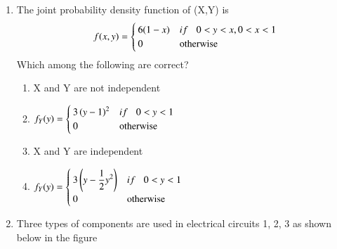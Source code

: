 \renewcommand{\theequation}{\theenumi}
\renewcommand{\thefigure}{\theenumi}
\begin{enumerate}[label=\thesection.\arabic*.,ref=\thesection.\theenumi]
\item The joint probability density function of (X,Y) is
\begin{equation}
    f(x,y) =
    \begin{cases}
        6(1-x) & if \hspace{0.3cm}0<y<x ,0<x<1\label{0.0.1} \\
        0      & \text{otherwise}
    \end{cases}
\end{equation}
Which among the following are correct?
\begin{enumerate}\itemsep0.3cm
    \item X and Y are not independent
    \item
          $ f_Y(y) =
              \begin{cases}
                  3\left(y-1\right)^{2} & if \hspace{0.3cm}0<y<1 \\
                  0               & \text{otherwise}
              \end{cases}$
    \item X and Y are independent
    \item $ f_Y(y) =
              \begin{cases}
                  3\left(\displaystyle{y-\frac{1}{2}{y}^2}\right) & if \hspace{0.3cm}0<y<1 \\
                  0                                         & \text{otherwise}
              \end{cases}$
\end{enumerate}
%
\solution

%
\item Three types of components are used in electrical circuits 1, 2, 3 as shown below in the figure
\begin{figure}[h]
    \centering

\end{figure}
\end{enumerate}
